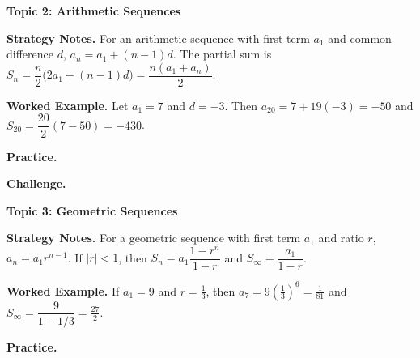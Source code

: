 \documentclass[12pt]{exam}
\newlength{\partskip}
\newcommand{\partspace}{\vspace*{\partskip}}
\begin{document}
\begin{questions}
\newpage

\question
\textbf{Topic 2: Arithmetic Sequences}

\textbf{Strategy Notes.} For an arithmetic sequence with first term $a_1$ and common difference $d$, $a_n=a_1+(n-1)d$. The partial sum is $S_n=\dfrac{n}{2}\bigl(2a_1+(n-1)d\bigr)=\dfrac{n(a_1+a_n)}{2}$.

\textbf{Worked Example.} Let $a_1=7$ and $d=-3$. Then $a_{20}=7+19(-3)=-50$ and $S_{20}=\dfrac{20}{2}(7-50)=-430$.

\textbf{Practice.}

\newpage
\textbf{Challenge.}

\newpage

\question
\textbf{Topic 3: Geometric Sequences}

\textbf{Strategy Notes.} For a geometric sequence with first term $a_1$ and ratio $r$, $a_n=a_1r^{n-1}$. If $|r|<1$, then $S_n=a_1\dfrac{1-r^n}{1-r}$ and $S_\infty=\dfrac{a_1}{1-r}$.

\textbf{Worked Example.} If $a_1=9$ and $r=\tfrac{1}{3}$, then $a_7=9\left(\tfrac{1}{3}\right)^6=\tfrac{1}{81}$ and $S_\infty=\dfrac{9}{1-1/3}=\tfrac{27}{2}$.

\textbf{Practice.}
\begin{parts}

\end{parts}
\end{questions}
\end{document}
